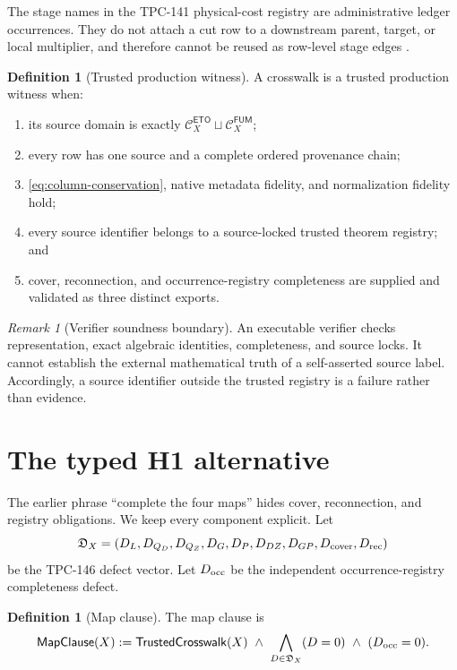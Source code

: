 \documentclass[11pt]{article}
\theoremstyle{definition}
\newtheorem{definition}[theorem]{Definition}
\theoremstyle{remark}
\newtheorem{remark}[theorem]{Remark}
\numberwithin{equation}{section}
\newcommand{\Ceto}{\mathcal C_X^{\mathsf{ETO}}}
\newcommand{\Cfum}{\mathcal C_X^{\mathsf{FUM}}}
\begin{document}
The stage names in the TPC-141 physical-cost registry are
administrative ledger occurrences.  They do not attach a cut row to
a downstream parent, target, or local multiplier, and therefore
cannot be reused as row-level stage edges \citep{WangTPC141}.

\begin{definition}[Trusted production witness]
A crosswalk is a trusted production witness when:
\begin{enumerate}[label=(\alph*),leftmargin=2em]
\item its source domain is exactly \(\Ceto\sqcup\Cfum\);
\item every row has one source and a complete ordered provenance
  chain;
\item \eqref{eq:column-conservation}, native metadata fidelity, and
  normalization fidelity hold;
\item every source identifier belongs to a source-locked trusted
  theorem registry; and
\item cover, reconnection, and occurrence-registry completeness are
  supplied and validated as three distinct exports.
\end{enumerate}
\end{definition}

\begin{remark}[Verifier soundness boundary]
An executable verifier checks representation, exact algebraic
identities, completeness, and source locks.  It cannot establish the
external mathematical truth of a self-asserted source label.
Accordingly, a source identifier outside the trusted registry is a
failure rather than evidence.
\end{remark}

\section{The typed H1 alternative}

The earlier phrase ``complete the four maps'' hides cover,
reconnection, and registry obligations.  We keep every component
explicit.  Let
\[
 \mathfrak D_X=
 (D_L,D_{Q_D},D_{Q_Z},D_G,D_P,D_{DZ},D_{GP},
   D_{\rm cover},D_{\rm rec})
\]
be the TPC-146 defect vector.  Let \(D_{\rm occ}\) be the independent
occurrence-registry completeness defect.

\begin{definition}[Map clause]
\label{def:mapclause}
The map clause is
\[
 \mathsf{MapClause}(X)
 :=
 \mathsf{TrustedCrosswalk}(X)
 \ \land\
 \bigwedge_{D\in\mathfrak D_X}(D=0)
 \ \land\
 (D_{\rm occ}=0).
\]
\end{definition}
\end{document}
